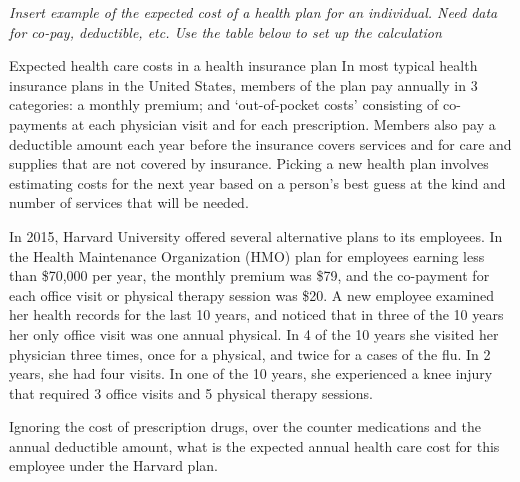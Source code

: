 \begin{doublespace}
\textit{Insert example of the expected cost of a health plan for an individual.  Need data for co-pay, deductible, etc.  Use the table below to set up the calculation}

\begin{example}{Expected health care costs in a health insurance plan}
In most typical health insurance plans in the United States, members of the plan pay annually in 3 categories:  a monthly premium; and `out-of-pocket costs' consisting of co-payments at each physician visit and for each prescription. Members also pay a deductible amount each year before the insurance covers services and for care and supplies that are not covered by insurance.  Picking a new health plan involves estimating costs for the next year based on a person's best guess at the kind and number of services that will be needed.

In 2015, Harvard University offered several alternative plans to its employees.   In the Health Maintenance Organization (HMO) plan for employees earning less than \$70,000 per year, the monthly premium was \$79, and the co-payment for each office visit or physical therapy session was \$20. A new employee examined her health records for the last 10 years, and noticed that in three of the 10 years her only office visit was one annual physical.  In 4 of the 10 years she visited her physician three times, once for a physical, and twice for a cases of the flu. In 2 years, she had four visits.  In one of the 10 years, she experienced a knee injury that required 3 office visits and 5 physical therapy sessions.

Ignoring the cost of prescription drugs, over the counter medications and the annual deductible amount, what is the expected annual health care cost for this employee under the Harvard plan.  


\end{example}
\end{doublespace}
